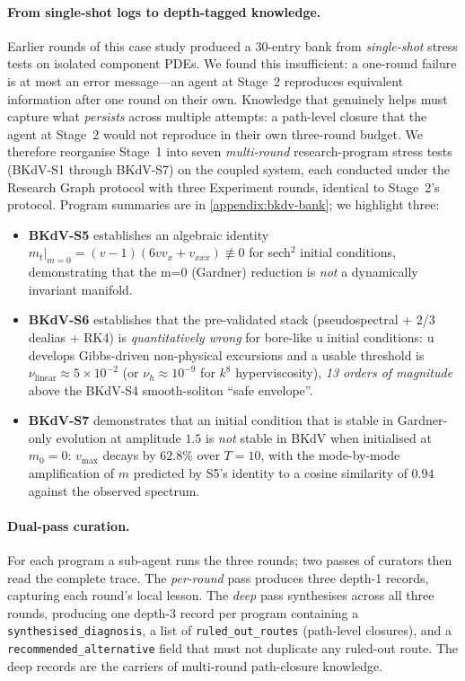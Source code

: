 \paragraph{From single-shot logs to depth-tagged knowledge.} Earlier rounds of
this case study produced a 30-entry bank from \emph{single-shot} stress tests
on isolated component PDEs. We found this insufficient: a one-round failure
is at most an error message---an agent at Stage~2 reproduces equivalent
information after one round on their own. Knowledge that genuinely helps must
capture what \emph{persists} across multiple attempts: a path-level closure
that the agent at Stage~2 would not reproduce in their own three-round
budget. We therefore reorganise Stage~1 into seven \emph{multi-round}
research-program stress tests (BKdV-S1 through BKdV-S7) on the coupled
system, each conducted under the Research Graph protocol with three Experiment
rounds, identical to Stage~2's protocol. Program summaries are in
\cref{appendix:bkdv-bank}; we highlight three:
\begin{itemize}
  \item \textbf{BKdV-S5} establishes an algebraic identity
        $m_t|_{m=0} = (v-1)(6 v v_x + v_{xxx}) \not\equiv 0$ for sech$^2$
        initial conditions, demonstrating that the m{=}0 (Gardner) reduction
        is \emph{not} a dynamically invariant manifold.
  \item \textbf{BKdV-S6} establishes that the pre-validated stack
        (pseudospectral + 2/3 dealias + RK4) is \emph{quantitatively wrong}
        for bore-like u initial conditions: u develops Gibbs-driven
        non-physical excursions and a usable threshold is
        $\nu_\text{linear} \approx 5\times 10^{-2}$ (or
        $\nu_h \approx 10^{-9}$ for $k^8$ hyperviscosity), \emph{13 orders of
        magnitude} above the BKdV-S4 smooth-soliton ``safe envelope''.
  \item \textbf{BKdV-S7} demonstrates that an initial condition that is
        stable in Gardner-only evolution at amplitude $1.5$ is \emph{not}
        stable in BKdV when initialised at $m_0 = 0$: $v_{\max}$ decays by
        $62.8\%$ over $T{=}10$, with the mode-by-mode amplification of $m$
        predicted by S5's identity to a cosine similarity of $0.94$ against
        the observed spectrum.
\end{itemize}

\paragraph{Dual-pass curation.} For each program a sub-agent runs the three
rounds; two passes of curators then read the complete trace. The
\emph{per-round} pass produces three depth-1 records, capturing each round's
local lesson. The \emph{deep} pass synthesises across all three rounds,
producing one depth-3 record per program containing a
\texttt{synthesised\_diagnosis}, a list of \texttt{ruled\_out\_routes}
(path-level closures), and a \texttt{recommended\_alternative} field that
must not duplicate any ruled-out route. The deep records are the carriers of
multi-round path-closure knowledge.

